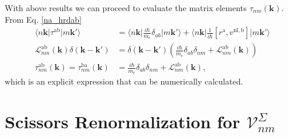 With above results we can proceed to evaluate the matrix elements
$\tau_{nm}(\mathbf{k})$. From Eq. \eqref{na_hrdab}
\begin{align}\label{na_hrdabn}
\langle n\mathbf{k}\vert \tau^{\mathrm{a}\mathrm{b}} \vert m\mathbf{k}'\rangle
&=\langle n\mathbf{k}\vert\frac{i\hbar}{m_e}\delta_{ab}\vert m\mathbf{k}'\rangle
+ \langle n\mathbf{k}\vert 
\frac{1}{i\hbar}
\left[r^{\mathrm{a}},v^{\mathrm{nl},\mathrm{b}}\right]
\vert m\mathbf{k}'\rangle\nonumber\\
\mathcal{L}^{\mathrm{a}\mathrm{b}}_{nm}(\mathbf{k})
\delta(\mathbf{k}-\mathbf{k}')
&= \delta(\mathbf{k}-\mathbf{k}')
\left(
  \frac{i\hbar}{m_e}\delta_{ab}\delta_{nm}
+ \mathcal{L}_{nm}^{\mathrm{a}\mathrm{b}}(\mathbf{k})
\right)\nonumber\\
\tau^{\mathrm{a}\mathrm{b}}_{nm}(\mathbf{k})
 = \tau^{\mathrm{b}\mathrm{a}}_{nm}(\mathbf{k})
&= \frac{i\hbar}{m_e}\delta_{ab}\delta_{nm}
+ \mathcal{L}_{nm}^{\mathrm{a}\mathrm{b}}(\mathbf{k}),
\end{align}
which is an explicit expression that can be numerically calculated.



\section{Scissors Renormalization for 
\texorpdfstring{$\boldsymbol{\mathcal{V}}^\Sigma_{nm}$}{Vnm}}
\label{app:voila}

